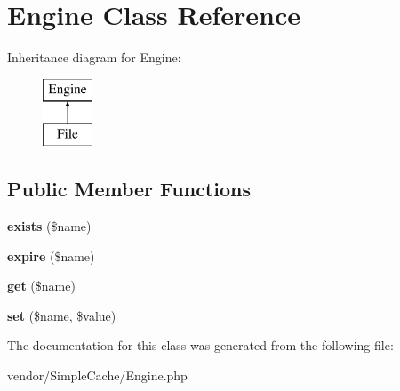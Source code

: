 \hypertarget{classEngine}{
\section{Engine Class Reference}
\label{classEngine}
}
Inheritance diagram for Engine:\begin{figure}[H]
\begin{center}
\leavevmode
\includegraphics[height=2.000000cm]{classEngine}
\end{center}
\end{figure}
\subsection*{Public Member Functions}
\begin{DoxyCompactItemize}
\item 
\hypertarget{classEngine_a64622afaba655f4892143ecd601fb85c}{
{\bfseries exists} (\$name)}
\label{classEngine_a64622afaba655f4892143ecd601fb85c}

\item 
\hypertarget{classEngine_a609fcc91638df2ecf67d148a6cabce15}{
{\bfseries expire} (\$name)}
\label{classEngine_a609fcc91638df2ecf67d148a6cabce15}

\item 
\hypertarget{classEngine_a3ffc4b0c4b21407c934ee0819b0ac2b2}{
{\bfseries get} (\$name)}
\label{classEngine_a3ffc4b0c4b21407c934ee0819b0ac2b2}

\item 
\hypertarget{classEngine_a5735e386e2ea33f92a4c1b3e3971f8f5}{
{\bfseries set} (\$name, \$value)}
\label{classEngine_a5735e386e2ea33f92a4c1b3e3971f8f5}

\end{DoxyCompactItemize}


The documentation for this class was generated from the following file:\begin{DoxyCompactItemize}
\item 
vendor/SimpleCache/Engine.php\end{DoxyCompactItemize}
